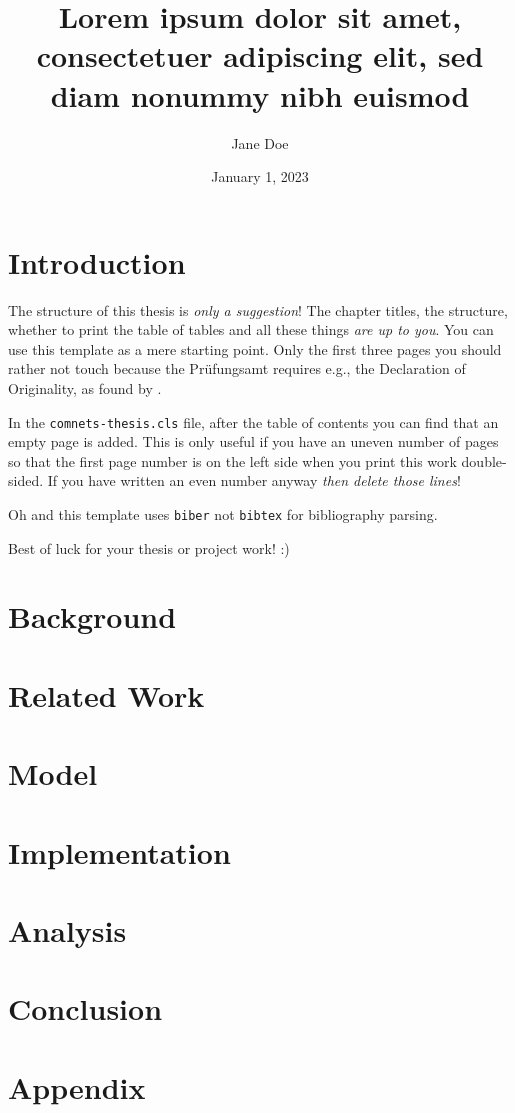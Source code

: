 \documentclass{comnets-thesis}
\title{Lorem ipsum dolor sit amet, consectetuer adipiscing elit, sed diam nonummy nibh euismod} %
\author{Jane Doe} %
\date{January 1, 2023} %
\begin{document}
\maketitlepage

\chapter{Introduction}\label{chp:introduction}
The structure of this thesis is \emph{only a suggestion}!
The chapter titles, the structure, whether to print the table of tables and all these things \emph{are up to you}.
You can use this template as a mere starting point. 
Only the first three pages you should rather not touch because the Prüfungsamt requires e.g., the Declaration of Originality, as found by \cite{SuperSmartGuy}.

In the \texttt{comnets-thesis.cls} file, after the table of contents you can find that an empty page is added.
This is only useful if you have an uneven number of pages so that the first page number is on the left side when you print this work double-sided.
If you have written an even number anyway \emph{then delete those lines}!

Oh and this template uses \texttt{biber} not \texttt{bibtex} for bibliography parsing.

Best of luck for your thesis or project work! :)

\chapter{Background}\label{chp:background}
\chapter{Related Work}\label{chp:related}
\chapter{Model}\label{chp:model}
\chapter{Implementation}\label{chp:implementation}
\chapter{Analysis}\label{chp:analysis}
\chapter{Conclusion}\label{chp:conclusion}
\appendix
\chapter{Appendix}\label{chp:appendix}
\listoffigures
\listoftables
\printbibliography[heading=bibintoc]
\end{document}
